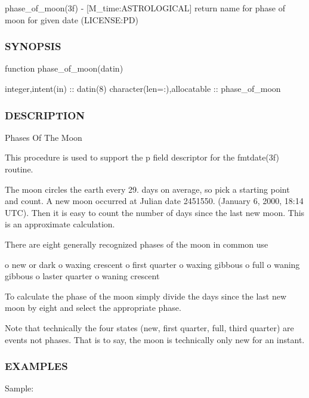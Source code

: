 phase\+\_\+of\+\_\+moon(3f) -\/ \mbox{[}M\+\_\+time\+:A\+S\+T\+R\+O\+L\+O\+G\+I\+C\+AL\mbox{]} return name for phase of moon for given date (L\+I\+C\+E\+N\+SE\+:PD) \subsubsection*{S\+Y\+N\+O\+P\+S\+IS}

function phase\+\_\+of\+\_\+moon(datin)

integer,intent(in) \+:\+: datin(8) character(len=\+:),allocatable \+:\+: phase\+\_\+of\+\_\+moon

\subsubsection*{D\+E\+S\+C\+R\+I\+P\+T\+I\+ON}

Phases Of The Moon

This procedure is used to support the p field descriptor for the fmtdate(3f) routine.

The moon circles the earth every 29. days on average, so pick a starting point and count. A new moon occurred at Julian date 2451550. (January 6, 2000, 18\+:14 U\+TC). Then it is easy to count the number of days since the last new moon. This is an approximate calculation.

There are eight generally recognized phases of the moon in common use

o new or dark o waxing crescent o first quarter o waxing gibbous o full o waning gibbous o laster quarter o waning crescent

To calculate the phase of the moon simply divide the days since the last new moon by eight and select the appropriate phase.

Note that technically the four states (new, first quarter, full, third quarter) are events not phases. That is to say, the moon is technically only new for an instant.

\subsubsection*{E\+X\+A\+M\+P\+L\+ES}

Sample\+:

